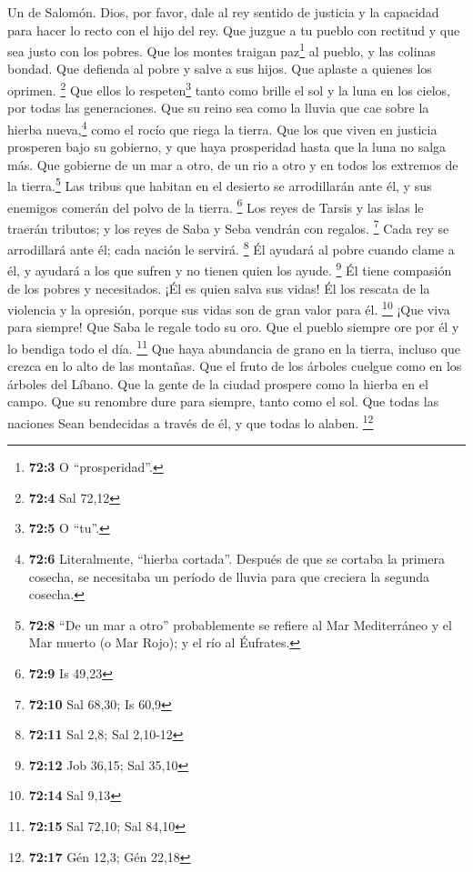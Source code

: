 Un de Salomón.  Dios, por favor, dale al rey sentido de
justicia y la capacidad para hacer lo recto con el hijo del rey.
 Que juzgue a tu pueblo con rectitud y que sea justo con
los pobres.  Que los montes traigan paz\footnote{\textbf{72:3}
  O ``prosperidad''.} al pueblo, y las colinas bondad. 
Que defienda al pobre y salve a sus hijos. Que aplaste a quienes los
oprimen. \footnote{\textbf{72:4} Sal 72,12}  Que ellos lo
respeten\footnote{\textbf{72:5} O ``tu''.} tanto como brille el sol y la
luna en los cielos, por todas las generaciones.  Que su
reino sea como la lluvia que cae sobre la hierba nueva,\footnote{\textbf{72:6}
  Literalmente, ``hierba cortada''. Después de que se cortaba la primera
  cosecha, se necesitaba un período de lluvia para que creciera la
  segunda cosecha.} como el rocío que riega la tierra. 
Que los que viven en justicia prosperen bajo su gobierno, y que haya
prosperidad hasta que la luna no salga más.  Que gobierne
de un mar a otro, de un rio a otro y en todos los extremos de la
tierra.\footnote{\textbf{72:8} ``De un mar a otro'' probablemente se
  refiere al Mar Mediterráneo y el Mar muerto (o Mar Rojo); y el río al
  Éufrates.}  Las tribus que habitan en el desierto se
arrodillarán ante él, y sus enemigos comerán del polvo de la tierra.
\footnote{\textbf{72:9} Is 49,23}  Los reyes de Tarsis y
las islas le traerán tributos; y los reyes de Saba y Seba vendrán con
regalos. \footnote{\textbf{72:10} Sal 68,30; Is 60,9} 
Cada rey se arrodillará ante él; cada nación le servirá. \footnote{\textbf{72:11}
  Sal 2,8; Sal 2,10-12}  Él ayudará al pobre cuando clame
a él, y ayudará a los que sufren y no tienen quien los ayude.
\footnote{\textbf{72:12} Job 36,15; Sal 35,10}  Él tiene
compasión de los pobres y necesitados. ¡Él es quien salva sus vidas!
 Él los rescata de la violencia y la opresión, porque sus
vidas son de gran valor para él. \footnote{\textbf{72:14} Sal 9,13}
 ¡Que viva para siempre! Que Saba le regale todo su oro.
Que el pueblo siempre ore por él y lo bendiga todo el día. \footnote{\textbf{72:15}
  Sal 72,10; Sal 84,10}  Que haya abundancia de grano en
la tierra, incluso que crezca en lo alto de las montañas. Que el fruto
de los árboles cuelgue como en los árboles del Líbano. Que la gente de
la ciudad prospere como la hierba en el campo.  Que su
renombre dure para siempre, tanto como el sol. Que todas las naciones
Sean bendecidas a través de él, y que todas lo alaben. \footnote{\textbf{72:17}
  Gén 12,3; Gén 22,18}

